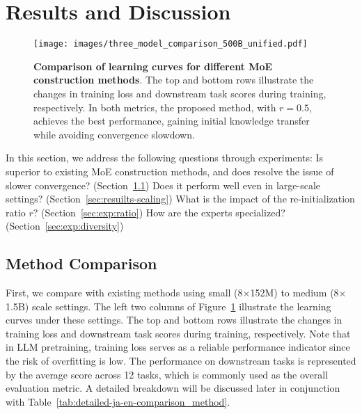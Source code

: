\section{Results and Discussion}
\label{sec:exp}

\begin{figure}[t]
\centering
\texttt{[image: images/three\_model\_comparison\_500B\_unified.pdf]} 
\vspace{-1em}
\caption{
\textbf{Comparison of learning curves for different MoE construction methods}.
The top and bottom rows illustrate the changes in training loss and downstream task scores during training, respectively. In both metrics, the proposed method, \methodname{} with $r=0.5$, achieves the best performance, gaining initial knowledge transfer while avoiding convergence slowdown. 
}


\label{fig:combined_train_loss_and_score}
\end{figure}


In this section, we address the following questions through experiments: 
 Is \methodname{} superior to existing MoE construction methods, and does \methodname{} resolve the issue of slower convergence? (Section~\ref{sec:result-method-comparison})  Does it perform well even in large-scale settings? (Section~\ref{sec:resuilts-scaling})  What is the impact of the re-initialization ratio 
$r$? (Section~\ref{sec:exp:ratio}) How are the experts specialized? (Section~\ref{sec:exp:diversity}) 



\subsection{Method Comparison}
\label{sec:result-method-comparison}
First, we compare \methodname{} with existing methods using small (8$\times$152M) to medium (8$\times$1.5B) scale settings. The left two columns of Figure~\ref{fig:combined_train_loss_and_score} illustrate the learning curves under these settings. The top and bottom rows illustrate the changes in training loss and downstream task scores during training, respectively. Note that in LLM pretraining, training loss serves as a reliable performance indicator since the risk of overfitting is low.
The performance on downstream tasks is represented by the average score across 12 tasks, which is commonly used as the overall evaluation metric. A detailed breakdown will be discussed later in conjunction with Table~\ref{tab:detailed-ja-en-comparison_method}.

